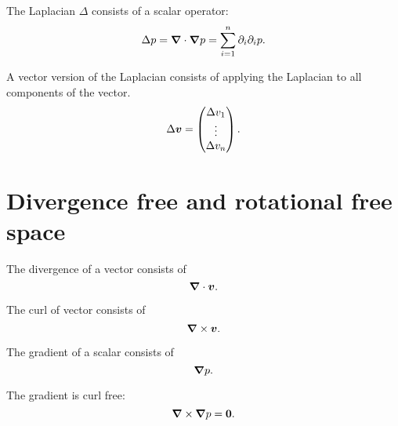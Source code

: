 \begin{definition}[Laplacian]
The Laplacian $\Delta$ consists of a scalar operator:
\begin{equation}
\Delta p={\boldsymbol {\nabla}}\cdot {\boldsymbol {\nabla}}p=\sum_{i=1}^{n} \partial_{i}\partial_{i}p.
\end{equation}
\end{definition}

\begin{definition}
A vector version of the Laplacian consists of applying the Laplacian to all components of the vector.
\begin{equation}
 \Delta {\boldsymbol {v}}=\begin{pmatrix} \Delta v_{1}\\
                  \vdots\\ \Delta v_{n}
                 \end{pmatrix}.
\end{equation}
\end{definition}
\section{Divergence free and rotational free space}

\begin{definition}[Divergence]
 The divergence of a vector consists of
 \begin{equation}
  {\boldsymbol {\nabla}} \cdot {\boldsymbol {v}}.
  \end{equation}
\end{definition}

\begin{definition}[Curl]
 The curl of vector consists of
 \begin{equation}
  {\boldsymbol {\nabla}} \times {\boldsymbol {v}}.
 \end{equation}
\end{definition}

\begin{definition}[Gradient]
 The gradient of a scalar consists of
 \begin{equation}
  {\boldsymbol {\nabla}} p.
 \end{equation}
\end{definition}

\begin{property}
 The gradient is curl free:
 \begin{equation}
  {\boldsymbol {\nabla}}\times {\boldsymbol {\nabla}} p={\boldsymbol {0}}.
 \end{equation}
\end{property}

